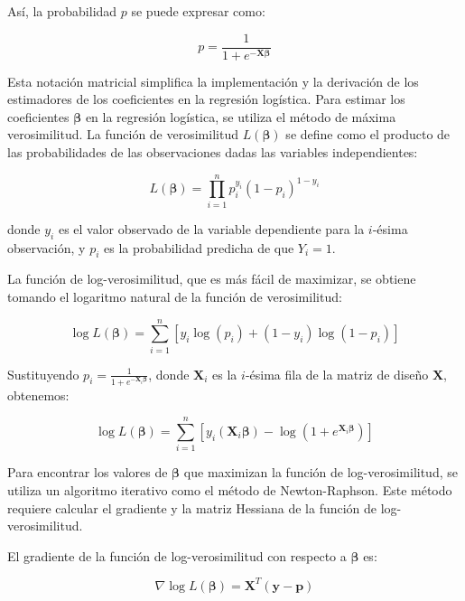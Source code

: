 Así, la probabilidad $p$ se puede expresar como:

\begin{equation}
p = \frac{1}{1 + e^{-\mathbf{X} \boldsymbol{\beta}}}
\end{equation}

Esta notación matricial simplifica la implementación y la derivación de los estimadores de los coeficientes en la regresión logística. Para estimar los coeficientes $\boldsymbol{\beta}$ en la regresión logística, se utiliza el método de máxima verosimilitud. La función de verosimilitud $L(\boldsymbol{\beta})$ se define como el producto de las probabilidades de las observaciones dadas las variables independientes:

\begin{equation}
L(\boldsymbol{\beta}) = \prod_{i=1}^{n} p_i^{y_i} (1 - p_i)^{1 - y_i}
\end{equation}

donde $y_i$ es el valor observado de la variable dependiente para la $i$-ésima observación, y $p_i$ es la probabilidad predicha de que $Y_i = 1$.

La función de log-verosimilitud, que es más fácil de maximizar, se obtiene tomando el logaritmo natural de la función de verosimilitud:

\begin{equation}
\log L(\boldsymbol{\beta}) = \sum_{i=1}^{n} \left[ y_i \log(p_i) + (1 - y_i) \log(1 - p_i) \right]
\end{equation}

Sustituyendo $p_i = \frac{1}{1 + e^{-\mathbf{X}_i \boldsymbol{\beta}}}$, donde $\mathbf{X}_i$ es la $i$-ésima fila de la matriz de diseño $\mathbf{X}$, obtenemos:

\begin{equation}
\log L(\boldsymbol{\beta}) = \sum_{i=1}^{n} \left[ y_i (\mathbf{X}_i \boldsymbol{\beta}) - \log(1 + e^{\mathbf{X}_i \boldsymbol{\beta}}) \right]
\end{equation}

Para encontrar los valores de $\boldsymbol{\beta}$ que maximizan la función de log-verosimilitud, se utiliza un algoritmo iterativo como el método de Newton-Raphson. Este método requiere calcular el gradiente y la matriz Hessiana de la función de log-verosimilitud.


El gradiente de la función de log-verosimilitud con respecto a $\boldsymbol{\beta}$ es:

\begin{equation}
\nabla \log L(\boldsymbol{\beta}) = \mathbf{X}^T (\mathbf{y} - \mathbf{p})
\end{equation}

